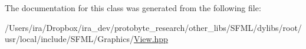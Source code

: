 The documentation for this class was generated from the following file\-:\begin{DoxyCompactItemize}
\item 
/\-Users/ira/\-Dropbox/ira\-\_\-dev/protobyte\-\_\-research/other\-\_\-libs/\-S\-F\-M\-L/dylibs/root/usr/local/include/\-S\-F\-M\-L/\-Graphics/\hyperlink{_view_8hpp}{View.\-hpp}\end{DoxyCompactItemize}
